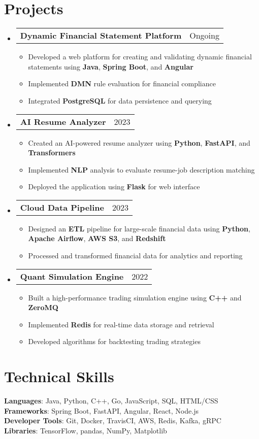 \documentclass[letterpaper,11pt]{article}
\makeatletter
\newcommand{\resumeItem}[1]{
    \item\small{
            {#1 \vspace{-2pt}}
    }
}
\newcommand{\resumeProjectHeading}[2]{
    \item
    \begin{tabular*}{0.97\textwidth}{l@{\extracolsep{\fill}}r}
    \small#1 & #2 \\
    \end{tabular*}\vspace{-7pt}
}
\newcommand{\resumeSubHeadingListStart}{\begin{itemize}[leftmargin=0.15in, label={}]}
\newcommand{\resumeSubHeadingListEnd}{\end{itemize}}
\newcommand{\resumeItemListStart}{\begin{itemize}}
\newcommand{\resumeItemListEnd}{\end{itemize}\vspace{-5pt}}
\makeatother
\begin{document}
\section{Projects}
\resumeSubHeadingListStart
\resumeProjectHeading
{\textbf{Dynamic Financial Statement Platform}}{Ongoing}
\resumeItemListStart
\resumeItem{Developed a web platform for creating and validating dynamic financial statements using \textbf{Java}, \textbf{Spring Boot}, and \textbf{Angular}}
\resumeItem{Implemented \textbf{DMN} rule evaluation for financial compliance}
\resumeItem{Integrated \textbf{PostgreSQL} for data persistence and querying}
\resumeItemListEnd
\resumeProjectHeading
{\textbf{AI Resume Analyzer}}{2023}
\resumeItemListStart
\resumeItem{Created an AI-powered resume analyzer using \textbf{Python}, \textbf{FastAPI}, and \textbf{Transformers}}
\resumeItem{Implemented \textbf{NLP} analysis to evaluate resume-job description matching}
\resumeItem{Deployed the application using \textbf{Flask} for web interface}
\resumeItemListEnd
\resumeProjectHeading
{\textbf{Cloud Data Pipeline}}{2023}
\resumeItemListStart
\resumeItem{Designed an \textbf{ETL} pipeline for large-scale financial data using \textbf{Python}, \textbf{Apache Airflow}, \textbf{AWS S3}, and \textbf{Redshift}}
\resumeItem{Processed and transformed financial data for analytics and reporting}
\resumeItemListEnd
\resumeProjectHeading
{\textbf{Quant Simulation Engine}}{2022}
\resumeItemListStart
\resumeItem{Built a high-performance trading simulation engine using \textbf{C++} and \textbf{ZeroMQ}}
\resumeItem{Implemented \textbf{Redis} for real-time data storage and retrieval}
\resumeItem{Developed algorithms for backtesting trading strategies}
\resumeItemListEnd
\resumeSubHeadingListEnd

\section{Technical Skills}
\begin{itemize}[leftmargin=0.15in, label={}]
\small{\item{
\textbf{Languages}{: Java, Python, C++, Go, JavaScript, SQL, HTML/CSS} \\
\textbf{Frameworks}{: Spring Boot, FastAPI, Angular, React, Node.js} \\
\textbf{Developer Tools}{: Git, Docker, TravisCI, AWS, Redis, Kafka, gRPC} \\
\textbf{Libraries}{: TensorFlow, pandas, NumPy, Matplotlib} \\
}}
\end{itemize}
\end{document}
